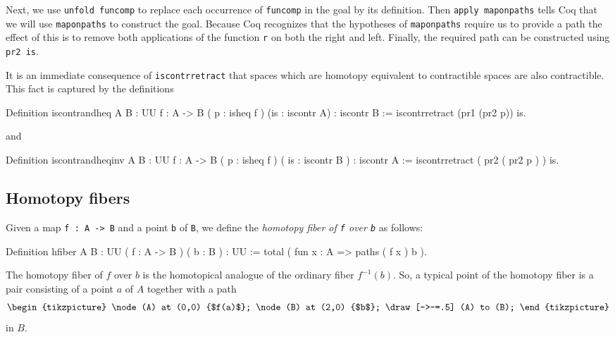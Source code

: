 Next, we use \verb|unfold funcomp| to replace each occurrence of 
\verb|funcomp| in the goal by its definition.  Then
\verb|apply maponpaths| tells Coq that we will use 
\verb|maponpaths| to construct the goal.  Because Coq recognizes
that the hypotheses of \verb|maponpaths| require us to provide a
path the effect of this is to remove both applications of the function
\verb|r| on both the right and left.  Finally, the required path
can be constructed using \verb|pr2 is|.

It is an immediate consequence of \verb|iscontrretract| that
spaces which are homotopy equivalent to contractible spaces are also
contractible.  This fact is captured by the definitions
\begin{center}
  \begin{coqcode}
Definition iscontrandheq { A B : UU } { f : A -> B } ( p : isheq f ) (is : iscontr A) : iscontr B := iscontrretract (pr1 (pr2 p)) is.
  \end{coqcode}
\end{center}
and
\begin{center}
  \begin{coqcode}
Definition iscontrandheqinv { A B : UU } { f : A -> B } ( p : isheq f ) ( is : iscontr B ) : iscontr A := iscontrretract ( pr2 ( pr2 p ) ) is. 
  \end{coqcode}
\end{center}

\subsection{Homotopy fibers}

Given a map \verb|f : A -> B| and a point \verb|b| of 
\verb|B|, we define the \emph{homotopy fiber of \texttt{f}
  over \texttt{b}} as follows:
\begin{center}
  \begin{coqcode}
Definition hfiber { A B : UU } ( f : A -> B ) ( b : B ) : UU := 
  total ( fun x : A => paths ( f x ) b ).
  \end{coqcode}
\end{center}
The homotopy fiber of $f$ over $b$ is the homotopical analogue of the
ordinary fiber $f^{-1}(b)$.  So, a typical point of the homotopy fiber
is a pair consisting of a point $a$ of $A$ together with a path 
\begin{align*}
  \begin{tikzpicture}
    \node (A) at (0,0) {$f(a)$};
    \node (B) at (2,0) {$b$};
    \draw[->-=.5] (A) to (B);
  \end{tikzpicture}
\end{align*}
in $B$.

